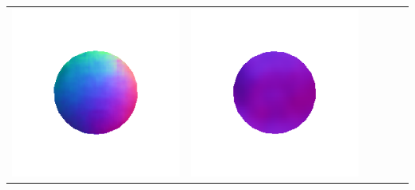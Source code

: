 \begin{center}
\begin{tabularx}{\linewidth}{@{}Y@{}Y@{}Y@{}Y@{}Y@{}Y@{}}
\includegraphics[width=\linewidth]{semisynthetic/20150514_1_marrnet_out.png} &
\includegraphics[width=\linewidth]{semisynthetic/20150514_1_ef_out.png} \\

\end{tabularx}
\end{center}
